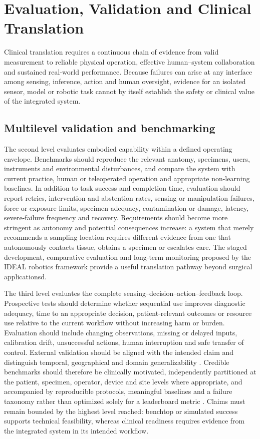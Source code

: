 \documentclass[12pt,a4paper]{article}
\begin{document}
\section{Evaluation, Validation and Clinical Translation}
\label{sec:validation_clinical_translation}
Clinical translation requires a continuous chain of evidence from valid measurement to reliable physical operation, effective human--system collaboration and sustained real-world performance. Because failures can arise at any interface among sensing, inference, action and human oversight, evidence for an isolated sensor, model or robotic task cannot by itself establish the safety or clinical value of the integrated system.


\subsection{Multilevel validation and benchmarking}
\label{subsec:multilevel_validation_benchmarking}
The second level evaluates embodied capability within a defined operating envelope. Benchmarks should reproduce the relevant anatomy, specimens, users, instruments and environmental disturbances, and compare the system with current practice, human or teleoperated operation and appropriate non-learning baselines. In addition to task success and completion time, evaluation should report retries, intervention and abstention rates, sensing or manipulation failures, force or exposure limits, specimen adequacy, contamination or damage, latency, severe-failure frequency and recovery. Requirements should become more stringent as autonomy and potential consequences increase: a system that merely recommends a sampling location requires different evidence from one that autonomously contacts tissue, obtains a specimen or escalates care. The staged development, comparative evaluation and long-term monitoring proposed by the IDEAL robotics framework provide a useful translation pathway beyond surgical applicationsd.

The third level evaluates the complete sensing--decision--action--feedback loop. Prospective tests should determine whether sequential use improves diagnostic adequacy, time to an appropriate decision, patient-relevant outcomes or resource use relative to the current workflow without increasing harm or burden. Evaluation should include changing observations, missing or delayed inputs, calibration drift, unsuccessful actions, human interruption and safe transfer of control. External validation should be aligned with the intended claim and distinguish temporal, geographical and domain generalizability \cite{deHond2023ClinicalAlgorithmValidation}. Credible benchmarks should therefore be clinically motivated, independently partitioned at the patient, specimen, operator, device and site levels where appropriate, and accompanied by reproducible protocols, meaningful baselines and a failure taxonomy rather than optimized solely for a leaderboard metric \cite{Mincu2022HealthcareBenchmarks}. Claims must remain bounded by the highest level reached: benchtop or simulated success supports technical feasibility, whereas clinical readiness requires evidence from the integrated system in its intended workflow.
\end{document}
